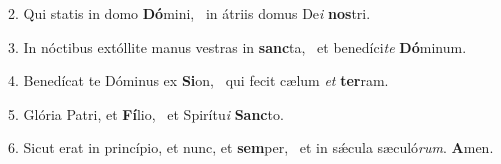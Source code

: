 2. Qui statis in domo \textbf{Dó}mini, \ast\  in átriis domus De\textit{i} \textbf{nos}tri.\

3. In nóctibus extóllite manus vestras in \textbf{sanc}ta, \ast\  et benedíci\textit{te} \textbf{Dó}minum.\

4. Benedícat te Dóminus ex \textbf{Si}on, \ast\  qui fecit cælum \textit{et} \textbf{ter}ram.\

5. Glória Patri, et \textbf{Fí}lio, \ast\  et Spirítu\textit{i} \textbf{Sanc}to.\

6. Sicut erat in princípio, et nunc, et \textbf{sem}per, \ast\  et in sǽcula sæculó\textit{rum}. \textbf{A}men.\

